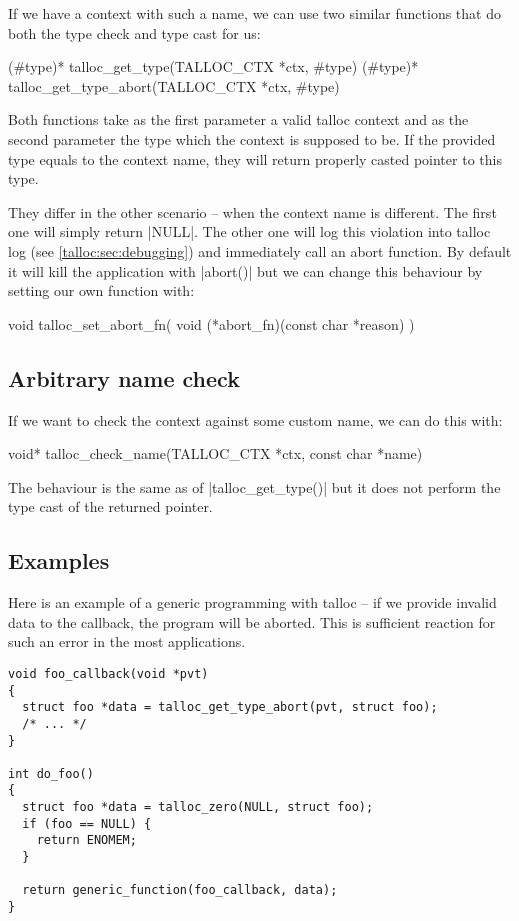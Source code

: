 If we have a context with such a name, we can use two similar functions that do
both the type check and type cast for us:

\begin{funcproto}
(#type)* talloc_get_type(TALLOC_CTX *ctx, #type)
(#type)* talloc_get_type_abort(TALLOC_CTX *ctx, #type)
\end{funcproto}
\funclistend
Both functions take as the first parameter a valid talloc context and as the
second parameter the type which the context is supposed to be. If the provided
type equals to the context name, they will return properly casted pointer to
this type.

They differ in the other scenario -- when the context name is different. The
first one will simply return |NULL|. The other one will log this violation into
talloc log (see \ref{talloc:sec:debugging}) and immediately call an abort
function. By default it will kill the application with |abort()| but we can
change this behaviour by setting our own function with:

\begin{funcproto}
void talloc_set_abort_fn(
  void (*abort_fn)(const char *reason)
)
\end{funcproto}

\subsection{Arbitrary name check}

If we want to check the context against some custom name, we can do this with:

\begin{funcproto}
void* talloc_check_name(TALLOC_CTX *ctx, const char *name)
\end{funcproto}
\funclistend
The behaviour is the same as of |talloc_get_type()| but it does not perform the
type cast of the returned pointer.

\subsection{Examples}

Here is an example of a generic programming with talloc -- if we provide invalid
data to the callback, the program will be aborted. This is sufficient
reaction for such an error in the most applications.

\begin{lstlisting}[caption={Dynamic type system \#1}]
void foo_callback(void *pvt)
{
  struct foo *data = talloc_get_type_abort(pvt, struct foo);
  /* ... */
}

int do_foo()
{
  struct foo *data = talloc_zero(NULL, struct foo);
  if (foo == NULL) {
    return ENOMEM;
  }

  return generic_function(foo_callback, data);
}
\end{lstlisting}

